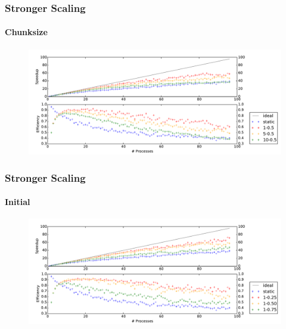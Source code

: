 \begin{frame}
    \frametitle{Stronger Scaling}
    \framesubtitle{Chunksize}

    \begin{figure}
        \centering
        \centering
        \includegraphics[width=\textwidth]{content/img/strong_scaling_time_chunksize}
    \end{figure}

\end{frame}

\begin{frame}
    \frametitle{Stronger Scaling}
    \framesubtitle{Initial}

    \begin{figure}
        \centering
        \centering
        \includegraphics[width=\textwidth]{content/img/strong_scaling_time_initial}
    \end{figure}

\end{frame}

